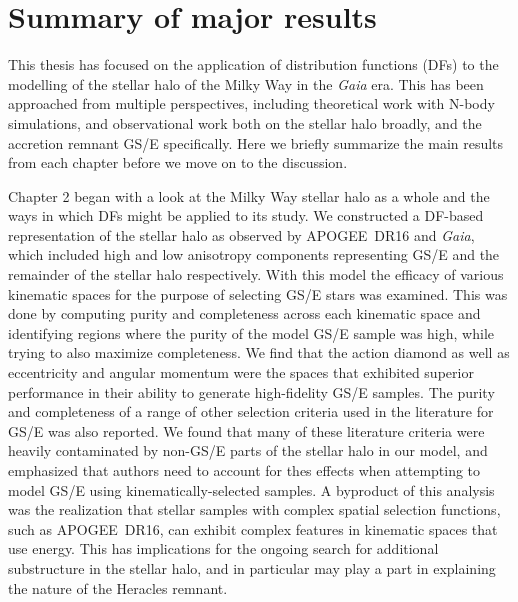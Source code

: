 \section{Summary of major results}

This thesis has focused on the application of distribution functions (DFs) to the modelling of the stellar halo of the Milky Way in the \textit{Gaia} era. This has been approached from multiple perspectives, including theoretical work with N-body simulations, and observational work both on the stellar halo broadly, and the accretion remnant GS/E specifically. Here we briefly summarize the main results from each chapter before we move on to the discussion.

Chapter 2 began with a look at the Milky Way stellar halo as a whole and the ways in which DFs might be applied to its study. We constructed a DF-based representation of the stellar halo as observed by APOGEE~DR16 and \textit{Gaia}, which included high and low anisotropy components representing GS/E and the remainder of the stellar halo respectively. With this model the efficacy of various kinematic spaces for the purpose of selecting GS/E stars was examined. This was done by computing purity and completeness across each kinematic space and identifying regions where the purity of the model GS/E sample was high, while trying to also maximize completeness. We find that the action diamond as well as eccentricity and angular momentum were the spaces that exhibited superior performance in their ability to generate high-fidelity GS/E samples. The purity and completeness of a range of other selection criteria used in the literature for GS/E was also reported. We found that many of these literature criteria were heavily contaminated by non-GS/E parts of the stellar halo in our model, and emphasized that authors need to account for thes effects when attempting to model GS/E using kinematically-selected samples. A byproduct of this analysis was the realization that stellar samples with complex spatial selection functions, such as APOGEE~DR16, can exhibit complex features in kinematic spaces that use energy. This has implications for the ongoing search for additional substructure in the stellar halo, and in particular may play a part in explaining the nature of the Heracles remnant. 

